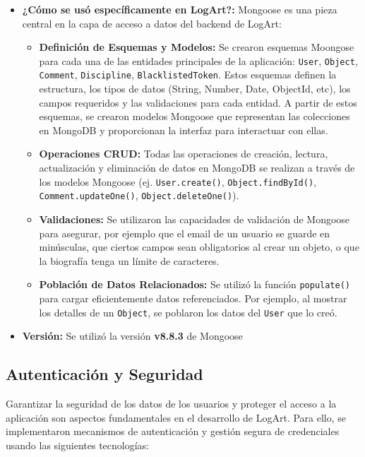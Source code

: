 \begin{itemize}
    \item \textbf{¿Cómo se usó específicamente en LogArt?:} Mongoose es una pieza central en la capa de acceso a datos del backend de LogArt:
        \begin{itemize}
            \item \textbf{Definición de Esquemas y Modelos:} Se crearon esquemas Moongose para cada una de las entidades principales de la aplicación: \texttt{User}, \texttt{Object}, \texttt{Comment}, \texttt{Discipline}, \texttt{BlacklistedToken}. Estos esquemas definen la estructura, los tipos de datos (String, Number, Date, ObjectId, etc), los campos requeridos y las validaciones para cada entidad. A partir de estos esquemas, se crearon modelos Mongoose que representan las colecciones en MongoDB y proporcionan la interfaz para interactuar con ellas.
            \item \textbf{Operaciones CRUD:} Todas las operaciones de creación, lectura, actualización y eliminación de datos en MongoDB se realizan a través de los modelos Mongoose (ej. \texttt{User.create()}, \texttt{Object.findById()}, \texttt{Comment.updateOne()}, \texttt{Object.deleteOne()}).
            \item \textbf{Validaciones:} Se utilizaron las capacidades de validación de Mongoose para asegurar, por ejemplo que el email de un usuario se guarde en minúsculas, que ciertos campos sean obligatorios al crear un objeto, o que la biografía tenga un límite de caracteres.
            \item \textbf{Población de Datos Relacionados:} Se utilizó la función \texttt{populate()} para cargar eficientemente datos referenciados. Por ejemplo, al mostrar los detalles de un \texttt{Object}, se poblaron los datos del \texttt{User} que lo creó.
        \end{itemize}
    \item \textbf{Versión:} Se utilizó la versión \textbf{v8.8.3} de Mongoose
\end{itemize}

\subsection{Autenticación y Seguridad}
\label{sec:authSeguridadBackend}

Garantizar la seguridad de los datos de los usuarios y proteger el acceso a la aplicación son aspectos fundamentales en el desarrollo de LogArt. Para ello, se implementaron mecanismos de autenticación y gestión segura de credenciales usando las siguientes tecnologías:

